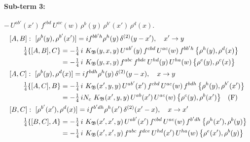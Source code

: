 \documentclass[10pt]{article}
\numberwithin{equation}{section}
\begin{document}
\paragraph{Sub-term 3:} $-\,U^{ab'}(x')\,f^{cbd}\,U^{ac}(w)\,\rho^{b}(y)\,\rho^{b'}(x')\,\rho^{d}(x)$.
\begin{align}
&[A,B]:\ [\rho^{b}(y),\rho^{b'}(x')]=i f^{bb'h}\rho^{h}(y)\,\delta^{(2)}(y-x'),\quad x'\to y\notag\\
&\qquad \tfrac14\{[A,B],C\}=-\tfrac14\,i\,\,K_{\mathfrak B}(y,x,y)\,U^{ab'}(y)\,f^{cbd}\,U^{ac}(w)\,f^{bb'h}\,\big\{\rho^{h}(y),\rho^{d}(x)\big\}\notag\\
&\qquad\phantom{\tfrac14\{[A,B],C\}}=-\tfrac14\,i\,\,K_{\mathfrak B}(y,x,y)\,f^{abc}\,f^{bde}\,U^{hd}(y)\,U^{ha}(w)\,\big\{\rho^{e}(y),\rho^{c}(x)\big\}
\label{R:eq:GIII.II-3-AB}\\
&[A,C]:\ [\rho^{b}(y),\rho^{d}(x)]=i f^{bdh}\rho^{h}(y)\,\delta^{(2)}(y-x),\quad x\to y\notag\\
&\qquad \tfrac14\{[A,C],B\}=-\tfrac14\,i\,\,K_{\mathfrak B}(x',y,y)\,U^{ab'}(x')\,f^{cbd}\,U^{ac}(w)\,f^{bdh}\,\big\{\rho^{h}(y),\rho^{b'}(x')\big\}\notag\\
&\qquad\phantom{\tfrac14\{[A,C],B\}}=-\tfrac14\,i N_{c}\,\,K_{\mathfrak B}(x',y,y)\,U^{ab}(x')\,U^{ac}(w)\,\big\{\rho^{c}(y),\rho^{b}(x')\big\}\quad\text{(F)}
\label{R:eq:GIII.II-3-AC}\\
&[B,C]:\ [\rho^{b'}(x'),\rho^{d}(x)]=i f^{b'dh}\rho^{h}(x')\,\delta^{(2)}(x'-x),\quad x\to x'\notag\\
&\qquad \tfrac14\{[B,C],A\}=-\tfrac14\,i\,\,K_{\mathfrak B}(x',x',y)\,U^{ab'}(x')\,f^{cbd}\,U^{ac}(w)\,f^{b'dh}\,\big\{\rho^{h}(x'),\rho^{b}(y)\big\}\notag\\
&\qquad\phantom{\tfrac14\{[B,C],A\}}=-\tfrac14\,i\,\,K_{\mathfrak B}(x',x',y)\,f^{abc}\,f^{dce}\,U^{hd}(x')\,U^{ha}(w)\,\big\{\rho^{e}(x'),\rho^{b}(y)\big\}
\label{R:eq:GIII.II-3-BC}
\end{align}
\end{document}
